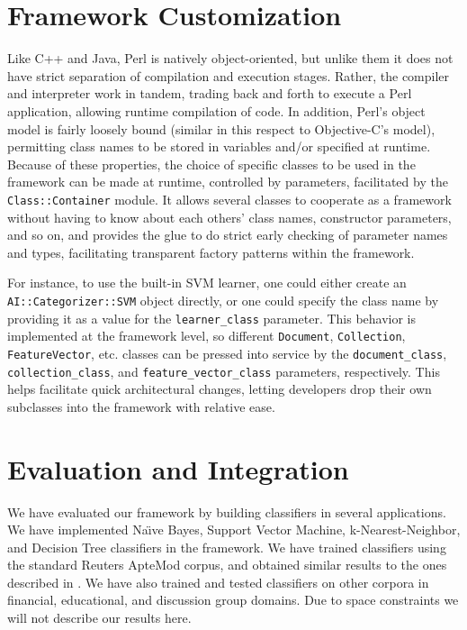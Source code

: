 \documentclass[a4paper,twocolumn]{article}
\begin{document}
\section{Framework Customization}

Like C++ and Java, Perl is natively object-oriented, but unlike them it does not have strict separation of compilation and execution stages.  Rather, the compiler and interpreter work in tandem, trading back and forth to execute a Perl application, allowing runtime compilation of code.  In addition, Perl's object model is fairly loosely bound (similar in this respect to Objective-C's model), permitting class names to be stored in variables and/or specified at runtime.  Because of these properties, the choice of specific classes to be used in the framework can be made at runtime, controlled by parameters, facilitated by the \texttt{Class::Container} module.  It allows several classes to cooperate as a framework without having to know about each others' class names, constructor parameters, and so on, and provides the glue to do strict early checking of parameter names and types, facilitating transparent factory patterns within the framework.

For instance, to use the built-in SVM learner, one could either create
an \texttt{AI::Categorizer::SVM} object directly, or one could specify
the class name by providing it as a value for the
\texttt{learner\_class} parameter.  This behavior is implemented at
the framework level, so different \texttt{Document},
\texttt{Collection}, \texttt{FeatureVector}, etc. classes can be
pressed into service by the \texttt{document\_class},
\texttt{collection\_class}, and \texttt{feature\_vector\_class}
parameters, respectively.  This helps facilitate quick architectural
changes, letting developers drop their own subclasses into the
framework with relative ease.


\section{Evaluation and Integration}

We have evaluated our framework by building classifiers in several
applications.  We have implemented Na\"\i ve Bayes, Support Vector
Machine, k-Nearest-Neighbor, and Decision Tree classifiers in the
framework.  We have trained classifiers using the standard Reuters
ApteMod corpus, and obtained similar results to the ones described in
\cite{yang:99}.  We have also trained and tested classifiers on other
corpora in financial, educational, and discussion group domains.  Due
to space constraints we will not describe our results here.
\end{document}
